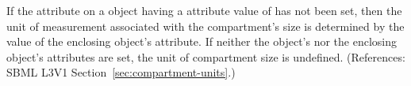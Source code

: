 If the attribute  on a \Compartment object having a
 attribute value of  has not been set, then
the unit of measurement associated with the compartment's size is
determined by the value of the enclosing \Model object's 
attribute.  If neither the \Compartment object's  nor the
enclosing \Model object's  attributes are set, the unit of
compartment size is undefined.  (References: SBML L3V1
Section~\ref{sec:compartment-units}.)
